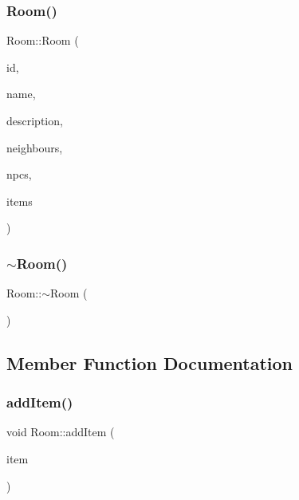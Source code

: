 \subsubsection{\texorpdfstring{Room()}{Room()}}
{\footnotesize\ttfamily Room\+::\+Room (\begin{DoxyParamCaption}\item[{std\+::string}]{id,  }\item[{std\+::string}]{name,  }\item[{std\+::string}]{description,  }\item[{\mbox{\hyperlink{_room_8h_a55f50192b1292aaa3b0967ecd0b1fddd}{t\+Neighbours}}}]{neighbours,  }\item[{\mbox{\hyperlink{_room_8h_af9e617d8fa018c922a1e9748f7e046f9}{t\+Npc\+List}}}]{npcs,  }\item[{\mbox{\hyperlink{_room_8h_a2b991bc4061fac67565cc6be66a568ac}{t\+Item\+List}}}]{items }\end{DoxyParamCaption})}

\mbox{\label{class_room_a67d5da09983cc53097807fd43ba5481a}} 
\subsubsection{\texorpdfstring{$\sim$\+Room()}{~Room()}}
{\footnotesize\ttfamily Room\+::$\sim$\+Room (\begin{DoxyParamCaption}{ }\end{DoxyParamCaption})\hspace{0.3cm}{\ttfamily [virtual]}}



\subsection{Member Function Documentation}
\mbox{\label{class_room_a25c9e7d11f19d950e8dee493e2fa0a54}} 
\subsubsection{\texorpdfstring{add\+Item()}{addItem()}}
{\footnotesize\ttfamily void Room\+::add\+Item (\begin{DoxyParamCaption}\item[{\mbox{\hyperlink{class_item}{Item}} $\ast$}]{item }\end{DoxyParamCaption})}

